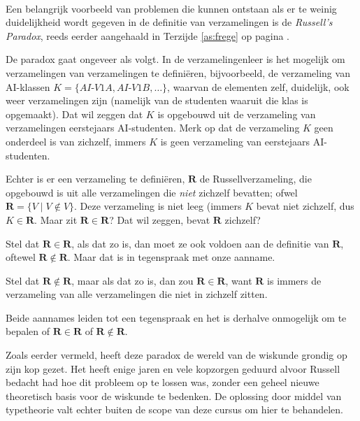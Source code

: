 \begin{aside}\label{as:russel:paradox}\mbox{}\\
Een belangrijk voorbeeld van problemen die kunnen ontstaan als er te weinig duidelijkheid wordt gegeven in de definitie van verzamelingen is de \emph{Russell's Paradox}, reeds eerder aangehaald in Terzijde \ref{as:frege} op pagina \pageref{as:frege}.

De paradox gaat ongeveer als volgt. In de verzamelingenleer is het mogelijk om verzamelingen van verzamelingen te defini\"eren, bijvoorbeeld, de verzameling van AI-klassen $K = \{AI\text{-}V1A, AI\text{-}V1B, \ldots\}$, waarvan de elementen zelf, duidelijk, ook weer verzamelingen zijn (namelijk van de studenten waaruit die klas is opgemaakt). Dat wil zeggen dat $K$ is opgebouwd uit de verzameling van verzamelingen eerstejaars AI-studenten. Merk op dat de verzameling $K$ geen onderdeel is van zichzelf, immers $K$ is geen verzameling van eerstejaars AI-studenten. 

Echter is er een verzameling te defini\"eren, $\mathbf{R}$ de Russellverzameling, die opgebouwd is uit alle verzamelingen die \emph{niet} zichzelf bevatten; ofwel $\mathbf{R} = \{V\;|\;V\not\in V\}$. Deze verzameling is niet leeg (immers $K$ bevat niet zichzelf, dus $K\in\mathbf{R}$. Maar zit $\mathbf{R}\in\mathbf{R}$? Dat wil zeggen, bevat $\mathbf{R}$ zichzelf?

Stel dat $\mathbf{R}\in\mathbf{R}$, als dat zo is, dan moet ze ook voldoen aan de definitie van $\mathbf{R}$, oftewel $\mathbf{R}\not\in\mathbf{R}$. Maar dat is in tegenspraak met onze aanname.

Stel dat $\mathbf{R}\not\in\mathbf{R}$, maar als dat zo is, dan zou $\mathbf{R}\in\mathbf{R}$, want $\mathbf{R}$ is immers de verzameling van alle verzamelingen die niet in zichzelf zitten.

Beide aannames leiden tot een tegenspraak en het is derhalve onmogelijk om te bepalen of $\mathbf{R}\in\mathbf{R}$ of $\mathbf{R}\not\in\mathbf{R}$. 

Zoals eerder vermeld, heeft deze paradox de wereld van de wiskunde grondig op zijn kop gezet. Het heeft enige jaren en vele kopzorgen geduurd alvoor Russell bedacht had hoe dit probleem op te lossen was, zonder een geheel nieuwe theoretisch basis voor de wiskunde te bedenken. De oplossing door middel van typetheorie valt echter buiten de scope van deze cursus om hier te behandelen.
\end{aside}

